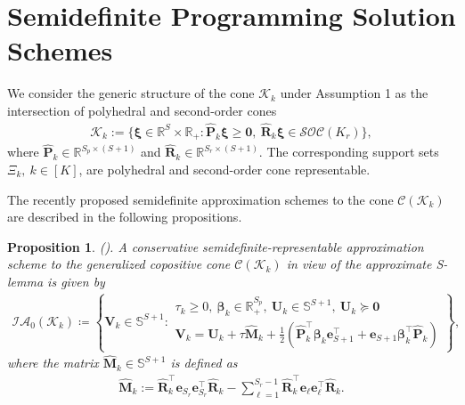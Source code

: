 \documentclass{article}
\newcommand{\RR}{\mathbb{R}}
\newtheorem{proposition}{Proposition}
\begin{document}



\section{Semidefinite Programming Solution Schemes}

We consider the generic structure of the cone $\mathcal{K}_k$ under Assumption 1 as the intersection of polyhedral and second-order cones
\begin{equation*}
\begin{array}{clll}
\mathcal K_k:= \{ \bm \xi \in \RR^{S} \times \RR_{+} :\hat{\bm P}_k \bm \xi \geq \bm 0, \ \hat{\bm R}_k \bm \xi\in \mathcal{SOC}(K_r) \},
\end{array}
\end{equation*}
where $\hat{\bm P}_k \in \RR^{S_p \times (S+1)}$ and $\hat{\bm R}_k \in \RR^{S_r \times (S+1)}$. The corresponding support sets $\Xi_k, \ k \in [K]$, are polyhedral and second-order cone representable.

The recently proposed semidefinite approximation schemes to the cone $\mathcal{C} (\mathcal K_k)$ are described in the following propositions. 
\begin{proposition} \textup{(\cite[Theorem B.3.1]{S-lemma}).}
A conservative semidefinite-representable approximation scheme to the generalized copositive cone $\mathcal{C} (\mathcal K_k)$ in view of the approximate S-lemma is given by
\begin{equation}
\label{eq:sdp1}
\begin{array}{clll}
     \mathcal{IA}_0(\mathcal K_k) \coloneqq \left\{ \bm V_k \in \mathbb{S}^{S+1}: \begin{matrix} \tau_k \geq 0, \ \bm \beta_k \in \RR^{S_p}_{+}, \ \bm U_k \in \mathbb{S}^{S+1}, \ \bm U_k \succeq \bm 0\\
     \bm V_k = \bm U_k + \tau \hat{\bm M}_k + \frac{1}{2}(\hat{\bm P}_k^\top \bm \beta_k \mathbf{e}^\top_{S+1} + \mathbf{e}_{S+1}\bm \beta_k^\top\hat{\bm P}_k)
    \end{matrix}\right\},
\end{array}
\end{equation}
where the matrix $\hat{\bm M}_k \in \mathbb{S}^{S+1}$ is defined as
\begin{equation}
\label{eq:sdp_m}
\begin{array}{clll}
\hat{\bm M}_k:= \hat{\bm R}_k^\top \mathbf{e}_{S_r}\mathbf{e}_{S_r}^\top \hat{\bm R}_k - \sum_{\ell =  1}^{S_r - 1}\hat{\bm R}_k^\top \mathbf{e}_{\ell}\mathbf{e}_{\ell}^\top \hat{\bm R}_k.
\end{array}
\end{equation}
\end{proposition}
\end{document}
